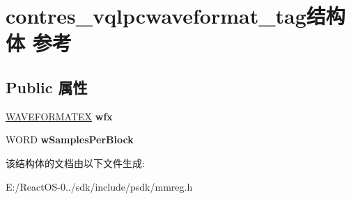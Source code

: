 \hypertarget{structcontres__vqlpcwaveformat__tag}{}\section{contres\+\_\+vqlpcwaveformat\+\_\+tag结构体 参考}
\label{structcontres__vqlpcwaveformat__tag}
\subsection*{Public 属性}
\begin{DoxyCompactItemize}
\item 
\mbox{\label{structcontres__vqlpcwaveformat__tag_abe16a9b9b035675a57954fd4c01db2d4}} 
\hyperlink{struct_w_a_v_e_f_o_r_m_a_t_e_x}{W\+A\+V\+E\+F\+O\+R\+M\+A\+T\+EX} {\bfseries wfx}
\item 
\mbox{\label{structcontres__vqlpcwaveformat__tag_a0f586509f6b0d963fac9d872b3680477}} 
W\+O\+RD {\bfseries w\+Samples\+Per\+Block}
\end{DoxyCompactItemize}


该结构体的文档由以下文件生成\+:\begin{DoxyCompactItemize}
\item 
E\+:/\+React\+O\+S-\/0../sdk/include/psdk/mmreg.\+h\end{DoxyCompactItemize}
